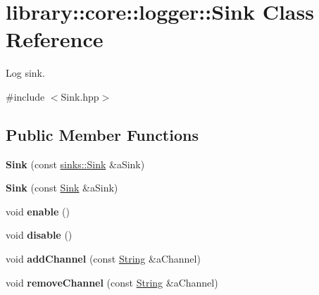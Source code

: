 \hypertarget{classlibrary_1_1core_1_1logger_1_1_sink}{}\section{library\+:\+:core\+:\+:logger\+:\+:Sink Class Reference}
\label{classlibrary_1_1core_1_1logger_1_1_sink}


Log sink.  




{\ttfamily \#include $<$Sink.\+hpp$>$}

\subsection*{Public Member Functions}
\begin{DoxyCompactItemize}
\item 
\mbox{\label{classlibrary_1_1core_1_1logger_1_1_sink_a9a09bc8eecde876eda9ee3e1a065b638}} 
{\bfseries Sink} (const \hyperlink{classlibrary_1_1core_1_1logger_1_1sinks_1_1_sink}{sinks\+::\+Sink} \&a\+Sink)
\item 
\mbox{\label{classlibrary_1_1core_1_1logger_1_1_sink_a078d839c57afa6e0a5c155a453e95239}} 
{\bfseries Sink} (const \hyperlink{classlibrary_1_1core_1_1logger_1_1_sink}{Sink} \&a\+Sink)
\item 
\mbox{\label{classlibrary_1_1core_1_1logger_1_1_sink_a726fd3b9e1c3a914fd4913d746656202}} 
void {\bfseries enable} ()
\item 
\mbox{\label{classlibrary_1_1core_1_1logger_1_1_sink_a94d8e1a986d1b105623ee86c91ad491c}} 
void {\bfseries disable} ()
\item 
\mbox{\label{classlibrary_1_1core_1_1logger_1_1_sink_a38376215a70240c65c17b1c89b7f7885}} 
void {\bfseries add\+Channel} (const \hyperlink{classlibrary_1_1core_1_1types_1_1_string}{String} \&a\+Channel)
\item 
\mbox{\label{classlibrary_1_1core_1_1logger_1_1_sink_ad10051906ffb85e6980b547a1fddf272}} 
void {\bfseries remove\+Channel} (const \hyperlink{classlibrary_1_1core_1_1types_1_1_string}{String} \&a\+Channel)
\end{DoxyCompactItemize}
